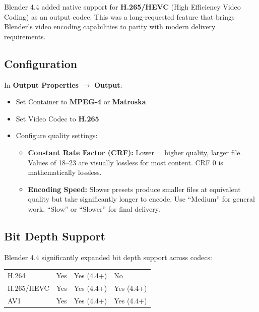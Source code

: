 Blender 4.4 added native support for \textbf{H.265/HEVC} (High Efficiency Video Coding) as an output codec. This was a long-requested feature that brings Blender's video encoding capabilities to parity with modern delivery requirements.

\subsection{Configuration}

In \textbf{Output Properties} $\rightarrow$ \textbf{Output}:

\begin{itemize}[leftmargin=2em]
  \item Set Container to \textbf{MPEG-4} or \textbf{Matroska}
  \item Set Video Codec to \textbf{H.265}
  \item Configure quality settings:
  \begin{itemize}[leftmargin=2em]
    \item \textbf{Constant Rate Factor (CRF):} Lower = higher quality, larger file. Values of 18--23 are visually lossless for most content. CRF 0 is mathematically lossless.
    \item \textbf{Encoding Speed:} Slower presets produce smaller files at equivalent quality but take significantly longer to encode. Use ``Medium'' for general work, ``Slow'' or ``Slower'' for final delivery.
  \end{itemize}
\end{itemize}

\subsection{Bit Depth Support}

Blender 4.4 significantly expanded bit depth support across codecs:

\vspace{0.5em}
\begin{tabularx}{\textwidth}{l C{2cm} C{2cm} C{2cm}}
\toprule
{}
 &  &  &  \\
\midrule
H.264 & Yes & Yes (4.4+) & No \\
H.265/HEVC & Yes & Yes (4.4+) & Yes (4.4+) \\
AV1 & Yes & Yes (4.4+) & Yes (4.4+) \\
\bottomrule
\end{tabularx}
\vspace{0.5em}

